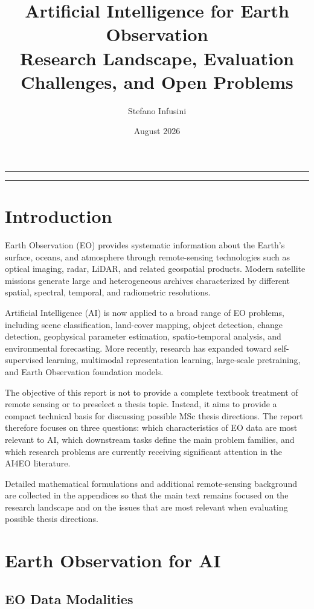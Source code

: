 \documentclass[
    11pt,
    a4paper,
    parskip=half,
    bibliography=totoc,
    numbers=noenddot
]{scrartcl}
\title{
    \textbf{Artificial Intelligence for Earth Observation}\\
    \vspace{0.3cm}
    \large Research Landscape, Evaluation Challenges, and Open Problems
}
\author{Stefano Infusini}
\date{August 2026}
\makeatletter
\renewcommand{\maketitle}{%
    \begin{titlepage}
        \thispagestyle{empty}
        \vspace*{1.45cm}

        {\color{Accent}\rule{2.4cm}{2.2pt}}\par
        \vspace{1.35cm}

        {\sffamily\bfseries\fontsize{29}{34}\selectfont\color{Navy}
            \@title\par}

        \vfill

        {\color{RuleGray}\rule{\textwidth}{0.7pt}}\par
        \vspace{0.6cm}

        {\sffamily\large\color{Navy}\@author\par}
        \vspace{0.18cm}
        {\sffamily\small\color{TextMuted}\@date\par}

        \vspace{0.75cm}
    \end{titlepage}
}
\makeatother
\begin{document}
\maketitle
\tableofcontents
\newpage

\section{Introduction}

Earth Observation (EO) provides systematic information about the Earth's
surface, oceans, and atmosphere through remote-sensing technologies such
as optical imaging, radar, LiDAR, and related geospatial products.
Modern satellite missions generate large and heterogeneous archives
characterized by different spatial, spectral, temporal, and radiometric
resolutions.

Artificial Intelligence (AI) is now applied to a broad range of EO
problems, including scene classification, land-cover mapping, object
detection, change detection, geophysical parameter estimation,
spatio-temporal analysis, and environmental forecasting. More recently,
research has expanded toward self-supervised learning, multimodal
representation learning, large-scale pretraining, and Earth Observation
foundation models.

The objective of this report is not to provide a complete textbook
treatment of remote sensing or to preselect a thesis topic. Instead, it
aims to provide a compact technical basis for discussing possible MSc
thesis directions. The report therefore focuses on three questions:
which characteristics of EO data are most relevant to AI, which
downstream tasks define the main problem families, and which research
problems are currently receiving significant attention in the AI4EO
literature.

Detailed mathematical formulations and additional remote-sensing
background are collected in the appendices so that the main text remains
focused on the research landscape and on the issues that are most
relevant when evaluating possible thesis directions.

\section{Earth Observation for AI}

\subsection{EO Data Modalities}
\end{document}
